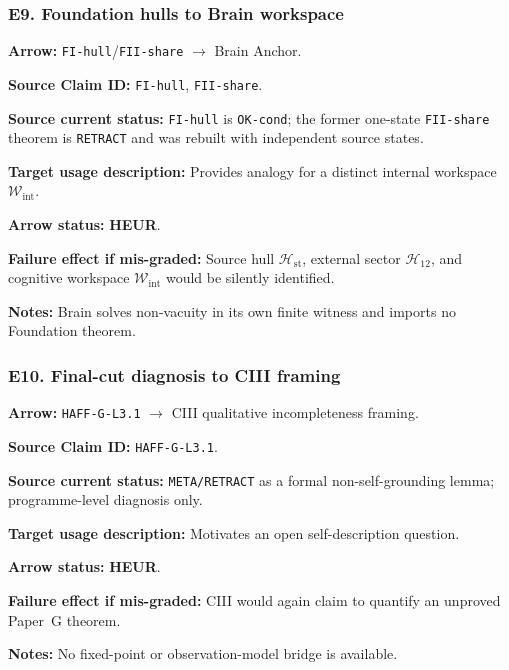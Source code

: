 \documentclass[12pt,a4paper]{article}
\begin{document}
\subsubsection*{E9. Foundation hulls to Brain workspace}
\noindent\textbf{Arrow:} \texttt{FI-hull}/\texttt{FII-share}
\(\to\) Brain Anchor.\par
\noindent\textbf{Source Claim ID:} \texttt{FI-hull},
\texttt{FII-share}.\par
\noindent\textbf{Source current status:} \texttt{FI-hull} is
\texttt{OK-cond}; the former one-state \texttt{FII-share} theorem is
\texttt{RETRACT} and was rebuilt with independent source states.\par
\noindent\textbf{Target usage description:} Provides analogy for a
distinct internal workspace \(\mathcal W_{\mathrm{int}}\).\par
\noindent\textbf{Arrow status:} \textbf{HEUR}.\par
\noindent\textbf{Failure effect if mis-graded:} Source hull
\(\mathcal H_{\mathrm{st}}\), external sector \(\mathcal H_{12}\), and
cognitive workspace \(\mathcal W_{\mathrm{int}}\) would be silently
identified.\par
\noindent\textbf{Notes:} Brain solves non-vacuity in its own finite
witness and imports no Foundation theorem.\par

\subsubsection*{E10. Final-cut diagnosis to CIII framing}
\noindent\textbf{Arrow:} \texttt{HAFF-G-L3.1}
\(\to\) CIII qualitative incompleteness framing.\par
\noindent\textbf{Source Claim ID:} \texttt{HAFF-G-L3.1}.\par
\noindent\textbf{Source current status:} \texttt{META/RETRACT} as a
formal non-self-grounding lemma; programme-level diagnosis only.\par
\noindent\textbf{Target usage description:} Motivates an open
self-description question.\par
\noindent\textbf{Arrow status:} \textbf{HEUR}.\par
\noindent\textbf{Failure effect if mis-graded:} CIII would again claim to
quantify an unproved Paper~G theorem.\par
\noindent\textbf{Notes:} No fixed-point or observation-model bridge is
available.\par
\end{document}
